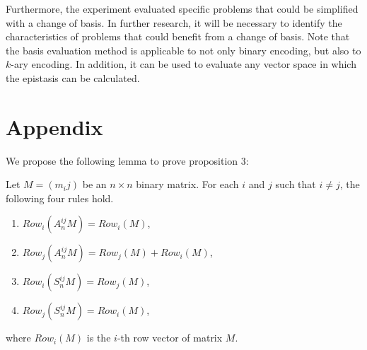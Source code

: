 Furthermore, the experiment evaluated specific problems that could be simplified with a change of basis. In further research, it will be necessary to identify the characteristics of problems that could benefit from a change of basis. Note that the basis evaluation method is applicable to not only binary encoding, but also to $ k $-ary encoding. In addition, it can be used to evaluate any vector space in which the epistasis can be calculated.


\section*{Appendix}
We propose the following lemma to prove proposition 3:
\begin{lemma}
Let $ M=(m_ij ) $ be an $ n\times n $ binary matrix. For each $ i $ and $ j $ such that $ i\neq j $, the following four rules hold.
\begin{enumerate}
	\item $ Row_i (A_n^{ij} M)=Row_i (M) $,
	\item $ Row_j (A_n^{ij} M)=Row_j (M)+Row_i (M) $,
	\item $ Row_i (S_n^{ij} M)=Row_j (M) $,
	\item $ Row_j (S_n^{ij} M)=Row_i (M) $,
\end{enumerate}
where $ Row_i (M) $ is the $ i $-th row vector of matrix $ M $.
\end{lemma}
